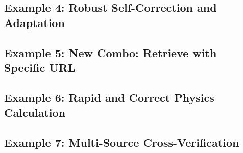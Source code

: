 \subsection{Example 4: Robust Self-Correction and Adaptation}
\label{case4_gaia_2}


\subsection{Example 5: New Combo: Retrieve with Specific URL}
\label{case5_hotpotqa_1}


\subsection{Example 6: Rapid and Correct Physics Calculation}
\label{case6_gpqa_1}


\subsection{Example 7:  Multi-Source Cross-Verification}
\label{case7_2wiki_1}

